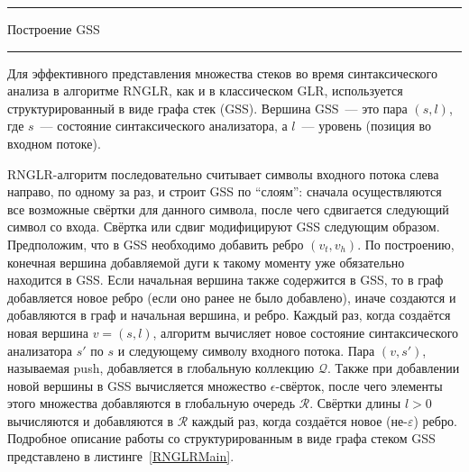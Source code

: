 \begin{listing}[!ht]
\hrule

\begin{algorithmic}[1]
\caption{Построение GSS}
\label{RNGLRMain}
  \EndIf
\EndFunction
{}
    \EndIf
  \EndIf
\EndFunction
\end{algorithmic}

\hrule
\end{listing}

Для эффективного представления множества стеков во время синтаксического анализа в алгоритме RNGLR, как и в классическом GLR, используется структурированный в виде графа стек (GSS). Вершина GSS~--- это пара $(s, l)$, где $s$~--- состояние синтаксического анализатора, а $l$~--- уровень (позиция во входном потоке).

RNGLR-алгоритм последовательно считывает символы входного потока слева направо, по одному за раз, и строит GSS по ``слоям'': сначала осуществляются все возможные свёртки для данного символа, после чего сдвигается следующий символ со входа. Свёртка или сдвиг модифицируют GSS следующим образом. Предположим, что в GSS необходимо добавить ребро $(v_t, v_h)$. По построению, конечная вершина добавляемой дуги к такому моменту уже обязательно находится в GSS. Если начальная вершина также содержится в GSS, то в граф добавляется новое ребро (если оно ранее не было добавлено), иначе создаются и добавляются в граф и начальная вершина, и ребро. Каждый раз, когда создаётся новая вершина $v=(s, l)$, алгоритм вычисляет новое состояние синтаксического анализатора $s'$ по $s$ и следующему символу входного потока. Пара $(v, s')$, называемая push, добавляется в глобальную коллекцию $\mathcal{Q}$. Также при добавлении новой вершины в GSS вычисляется множество $\epsilon$-свёрток, после чего элементы этого множества добавляются в глобальную очередь $\mathcal{R}$. Свёртки длины $l>0$ вычисляются и добавляются в $\mathcal{R}$ каждый раз, когда создаётся новое (не-$\varepsilon$) ребро. Подробное описание работы со структурированным в виде графа стеком GSS представлено в листинге~\ref{RNGLRMain}.


